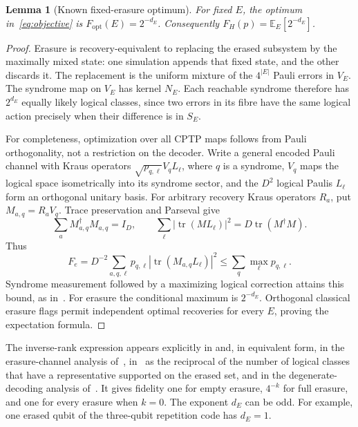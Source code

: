 \documentclass[11pt]{article}
\newtheorem{lemma}[theorem]{Lemma}
\theoremstyle{remark}
\newcommand{\E}{\mathbb E}
\newcommand{\tr}{\operatorname{tr}}
\begin{document}
\begin{lemma}[Known fixed-erasure optimum]\label{lem:fidelity}
For fixed \(E\), the optimum in~\eqref{eq:objective} is
\(F_{\mathrm{opt}}(E)=2^{-d_E}\). Consequently
\(F_H(p)=\E_E[2^{-d_E}]\).
\end{lemma}
\begin{proof}
Erasure is recovery-equivalent to replacing the erased subsystem by
the maximally mixed state: one simulation appends that fixed state,
and the other discards it. The replacement is the uniform mixture of
the \(4^{|E|}\) Pauli errors in \(V_E\).
The syndrome map on \(V_E\) has kernel \(N_E\). Each reachable syndrome
therefore has \(2^{d_E}\) equally likely logical classes, since two
errors in its fibre have the same logical action precisely when their
difference is in \(S_E\).

For completeness, optimization over all CPTP maps follows from
Pauli orthogonality, not a restriction on the decoder. Write a general
encoded Pauli channel with Kraus operators
\(\sqrt{p_{q,\ell}}V_qL_\ell\), where \(q\) is a syndrome,
\(V_q\) maps the logical space isometrically into its syndrome sector,
and the \(D^2\) logical Paulis \(L_\ell\) form an orthogonal unitary basis.
For arbitrary recovery Kraus operators \(R_a\), put \(M_{a,q}=R_aV_q\).
Trace preservation and Parseval give
\[
 \sum_aM_{a,q}^\dagger M_{a,q}=I_D,\qquad
 \sum_\ell|\tr(ML_\ell)|^2=D\tr(M^\dagger M).
\]
Thus
\[
 F_e=D^{-2}\sum_{a,q,\ell}p_{q,\ell}
       |\tr(M_{a,q}L_\ell)|^2
 \le\sum_q\max_\ell p_{q,\ell}.
\]
Syndrome measurement followed by a maximizing logical correction
attains this bound, as in~\cite[Appendix A]{fsw2008}.
For erasure the conditional maximum is \(2^{-d_E}\).
Orthogonal classical erasure flags permit independent optimal
recoveries for every \(E\), proving the expectation formula.
\end{proof}

The inverse-rank expression appears explicitly in
\cite[Eqs.~(17)--(18)]{gullans2021} and, in equivalent form, in the
erasure-channel analysis of~\cite{delfossezemor2013},
in~\cite[Section~III]{ashikhmin2020} as the reciprocal of the number of
logical classes that have a representative supported on the erased set,
and in the degenerate-decoding analysis of~\cite{kuoouyang2026}. It gives fidelity
one for empty erasure, \(4^{-k}\) for full erasure, and one for every
erasure when \(k=0\). The exponent \(d_E\) can be odd. For example, one
erased qubit of the three-qubit repetition code has \(d_E=1\).
\end{document}
